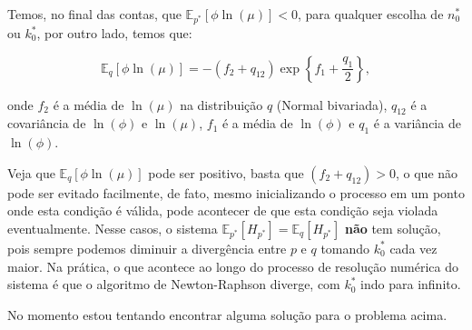 \documentclass[
]{article}
\begin{document}
Temos, no final das contas, que \(\mathbb{E}_{p^*}[\phi\ln(\mu)]<0\),
para qualquer escolha de \(n^*_0\) ou \(k^*_0\), por outro lado, temos
que:

\[
\mathbb{E}_{q}[\phi\ln(\mu)]=-(f_2+q_{12})\exp\left\{f_1+\frac{q_1}{2}\right\},
\]

onde \(f_2\) é a média de \(\ln(\mu)\) na distribuição \(q\) (Normal
bivariada), \(q_{12}\) é a covariância de \(\ln(\phi)\) e \(\ln(\mu)\),
\(f_1\) é a média de \(\ln(\phi)\) e \(q_1\) é a variância de
\(\ln(\phi)\).

Veja que \(\mathbb{E}_{q}[\phi\ln(\mu)]\) pode ser positivo, basta que
\((f_2+q_{12})>0\), o que não pode ser evitado facilmente, de fato,
mesmo inicializando o processo em um ponto onde esta condição é válida,
pode acontecer de que esta condição seja violada eventualmente. Nesse
casos, o sistema \(\mathbb{E}_{p^*}[H_{p^*}]=\mathbb{E}_{q}[H_{p^*}]\)
\textbf{não} tem solução, pois sempre podemos diminuir a divergência
entre \(p\) e \(q\) tomando \(k^*_0\) cada vez maior. Na prática, o que
acontece ao longo do processo de resolução numérica do sistema é que o
algoritmo de Newton-Raphson diverge, com \(k^*_0\) indo para infinito.

No momento estou tentando encontrar alguma solução para o problema
acima.
\end{document}
